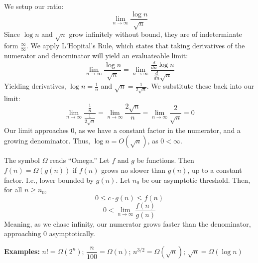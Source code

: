 \begin{Proof}[$\log n = O(\sqrt{n})$]
We setup our ratio:
\[\lim_{n\to\infty}\dfrac{\log n}{\sqrt{n}}\]
\noindent
Since $\log n$ and $\sqrt{n}$ grow infinitely without bound, they are of indeterminate form $\frac{\infty}{\infty}$. We apply L'Hopital's Rule, which states
that taking derivatives of the numerator and denominator will yield an evaluateable limit:
\Large
\[\lim_{n\to\infty}\dfrac{\log n}{\sqrt{n}}=\lim_{n\to\infty}\dfrac{\frac{d}{dn}\log n}{\frac{d}{dn}\sqrt{n}}\]
\normalsize
\noindent
Yielding derivatives, $\log n = \frac{1}{n}$ and $\sqrt{n}=\frac{1}{2\sqrt{n}}$. We substitute these back into our limit:
\Large
\[\lim_{n\to\infty}\dfrac{\frac{1}{n}}{\frac{1}{2\sqrt{n}}}=\lim_{n\to\infty}\dfrac{2\sqrt{n}}{n}=\lim_{n\to\infty}\dfrac{2}{\sqrt{n}}=0\]
\normalsize
\noindent
Our limit approaches 0, as we have a constant factor in the numerator, and a growing denominator. Thus, $\log n = O(\sqrt{n})$, as $0<\infty$.
\end{Proof}

\begin{Def}

    The symbol $\Omega$ reads ``Omega.'' Let $f$ and $g$ be functions. Then 
    $f(n)=\Omega(g(n))$ if $f(n)$ grows no slower than $g(n)$, up to a constant factor. I.e.,
    lower bounded by $g(n)$. Let $n_0$ be our asymptotic threshold. Then, for all $n\geq n_0$,
    \large
    \[0\leq c\cdot g(n) \leq f(n)\]
    \[0<\lim_{n\to\infty}\dfrac{f(n)}{g(n)}\]
    \normalsize
    \noindent
    Meaning, as we chase infinity, our numerator grows faster than the denominator, approaching 0 asymptotically.
\end{Def}

\noindent
\textbf{Examples:} $n!=\Omega(2^n)$; $\dfrac{n}{100}= \Omega(n)$; $n^{3/2}= \Omega(\sqrt{n})$; $\sqrt{n} = \Omega(\log n)$

\newpage

